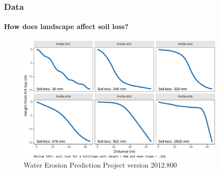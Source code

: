 \documentclass{snedecorbeamer}
\begin{document}
\begin{frame}
  \frametitle{Data}
  \framesubtitle{How does landscape affect soil loss?}

  \begin{figure}
    \centering
    \includegraphics[height=17em]{inc/wepp_elevation_profiles}
    \caption*{
          \href{https://www.ars.usda.gov/midwest-area/west-lafayette-in/national-soil-erosion-research/docs/wepp/}{}
      Water Erosion Prediction Project version 2012.800
    }
  \end{figure}

\end{frame}
\end{document}
